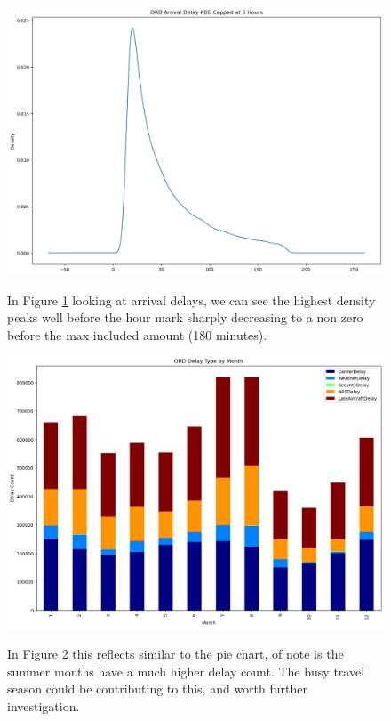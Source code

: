 \documentclass[a4paper,12pt]{article}
\begin{document}
\begin{figure}
    \centering
    \includegraphics*[scale=.45]{../../img/3h_kde.png}
    \caption[]{}
    \label{fig:3hkde}
    In Figure \ref{fig:3hkde} looking at arrival delays, we can see the highest density peaks well before the hour mark sharply decreasing to a non zero
    before the max included amount (180 minutes).
\end{figure}


\begin{figure}
    \centering
    \includegraphics*[scale=.40]{../../img/ord_delay_t_month.png}
    \caption[]{}
    \label{fig:delaybymonth}
    In Figure \ref{fig:delaybymonth} this reflects similar to the pie chart, of note is the summer months have a much higher delay count. The busy travel season could be contributing to this, and worth further investigation.
\end{figure}
\end{document}
